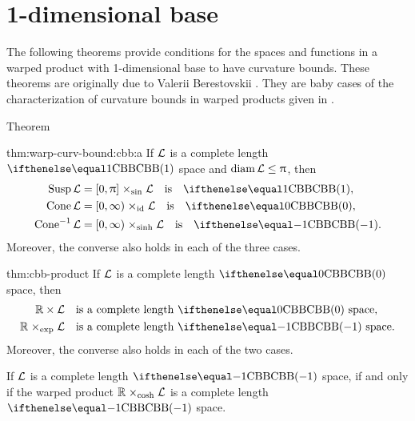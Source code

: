 \section{1-dimensional base}

The following theorems provide conditions for the spaces and functions in a warped product with 1-dimensional base to have curvature bounds.
These theorems are originally due to Valerii Berestovskii \cite{berestovskii}.
They are baby cases of the characterization of curvature bounds in warped products given in \cite{alexander-bishop:warps,alexander-bishop:warp1}.

\begin{thm}{Theorem}\label{thm:warp-curv-bound:cbb}
\begin{subthm}{thm:warp-curv-bound:cbb:a}
If $\mathcal{L}$ is a complete length $\Alex{1}$ space and $\diam\spc{L}\le\pi$, 
then 
\begin{align*}
\Susp\spc{L}&=[0,\pi]\warp{\sin}\spc{L}\quad\text{is}\quad \Alex1,
\\
\Cone\spc{L}&=[0,\infty)\warp{\id}\spc{L}\quad\text{is}\quad \Alex0,
\\
\Cone\mc{-1}\spc{L}&=[0,\infty)\warp{\sinh}\spc{L}\quad\text{is}\quad \Alex{-1}.
\end{align*}
Moreover, the converse also holds in each of the three cases.
\end{subthm}

\begin{subthm}{thm:cbb-product}
If $\mathcal{L}$ is a complete length $\Alex0$ space, 
then 
\begin{align*}
\RR\times\spc{L}&\quad\text{is a complete length $\Alex0$ space},
\\
\RR\warp{\exp}\spc{L}&\quad\text{is a complete length $\Alex{-1}$ space.}
\end{align*}
Moreover, the converse also holds in each of the two cases.
\end{subthm}

\begin{subthm}{}
If $\mathcal{L}$ is a complete length $\Alex{-1}$ space,
if and only if the warped product $\RR\warp{\cosh}\spc{L}$ is a complete length $\Alex{-1}$ space.
\end{subthm}
\end{thm}


